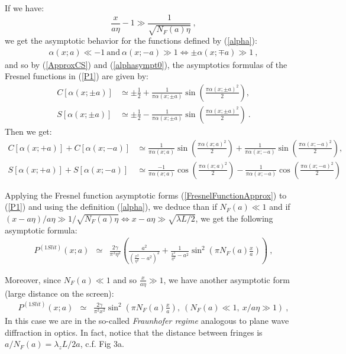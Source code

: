 \documentclass[12pt,aps,prb,preprint]{revtex4-1}   %
\begin{document}
{
If we have: $$\frac{x}{a\eta}-1\gg \frac{1}{\sqrt{N_F(a)\eta}}\ ,$$ 
we get the asymptotic behavior for the functions defined by (\ref{alpha}):
\begin{eqnarray}\label{alphasympt0}
\alpha(x;a)\ll-1\ \mathrm{and}\ \alpha(x;-a)\gg1 \Leftrightarrow \pm\alpha(x;\mp a)\gg1\ ,
\end{eqnarray}
and so by (\ref{ApproxCS}) and (\ref{alphasympt0}),
the asymptotics formulas of the Fresnel functions in (\ref{P1}) are given by:
\begin{align}\label{CSasympt1}
C[\alpha(x;\pm a)] &\simeq \pm\frac{1}{2} + \frac{1}{\pi\alpha(x;\pm a)}\sin{(\frac{\pi\alpha(x;\pm a)^2}{2})},
{}\nonumber\\{} S[\alpha(x;\pm a)] &\simeq \pm\frac{1}{2} - \frac{1}{\pi\alpha(x;\pm a)}\sin{(\frac{\pi\alpha(x;\pm a)^2}{2})}\ .
\end{align}}
{Then we get:
\begin{align}\label{FresnelFunctionApprox}
 C[\alpha(x;+a)]+C[\alpha(x;-a)] &\simeq \frac{1}{\pi\alpha(x;a)}\sin{(\frac{\pi\alpha(x;a)^2}{2})}
+\frac{1}{\pi\alpha(x;-a)}\sin{(\frac{\pi\alpha(x;-a)^2}{2})},
{}\nonumber\\{} S[\alpha(x;+a)]+S[\alpha(x;-a)] &\simeq \frac{-1}{\pi\alpha(x;a)}\cos{(\frac{\pi\alpha(x;a)^2}{2})}
-\frac{1}{\pi\alpha(x;-a)}\cos{(\frac{\pi\alpha(x;-a)^2}{2})}
\end{align}}


Applying the Fresnel function asymptotic forms (\ref{FresnelFunctionApprox}) to
(\ref{P1}) and using the definition (\ref{alpha}), we deduce than if $N_F(a)\ll 1$ and
if $(x-a\eta)/a\eta\gg 1/\sqrt{N_F(a)\eta}\Leftrightarrow
x-a\eta\gg\sqrt{\lambda L/2}$, we get the following asymptotic
formula:
\begin{eqnarray}\label{P1ApproxNFsmall0}
P^{(1 Slit)}(x;a)&\simeq&\frac{2\gamma}{\pi^2\eta^2}
\left(\frac{a^2}{(\frac{x^2}{\eta^2}-a^2)^2} +
\frac{1}{\frac{x^2}{\eta^2}-a^2}\sin^2{(\pi N_F(a)
\frac{x}{a})}\right) \ ,
\end{eqnarray}


Moreover, since $N_F(a)\ll1$ and so $\frac{x}{a\eta}\gg1$, we have another asymptotic form
(large distance on the screen):
\begin{eqnarray}\label{P1ApproxNFsmall}
P^{(1 Slit)}(x;a)&\simeq&\frac{2\gamma}{\pi^2 x^2} \sin^2{(\pi
N_F(a) \frac{x}{a})},\ (N_F(a)\ll1,\ x/a\eta\gg 1)\ ,
\end{eqnarray}
In this case we are in the so-called \textit{Fraunhofer regime}
analogous to plane wave diffraction in optics.\cite{Optics} In
fact, notice that the distance between fringes is
$a/N_F(a)=\lambda_z L/2a$, c.f. Fig 3a.
\end{document}
